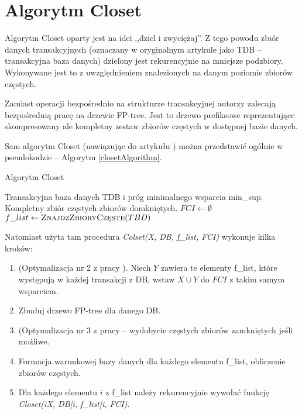 \section{Algorytm Closet}

Algorytm Closet oparty jest na idei ,,dziel i zwyciężaj''. 
Z tego powodu zbiór danych transakcyjnych (oznaczany w oryginalnym artykule jako TDB -- transakcyjna baza danych) dzielony jest rekurencyjnie na mniejsze podzbiory. Wykonywane jest to z uwzględnieniem znalezionych na danym poziomie zbiorów częstych.

Zamiast operacji bezpośrednio na strukturze transakcyjnej autorzy zalecają bezpośrednią pracę na drzewie FP-tree. 
Jest to drzewo prefiksowe reprezentujące skompresowany ale kompletny zestaw zbiorów częstych w dostępnej bazie danych.

Sam algorytm Closet (nawiązując do artykułu \cite{closetArt}) można przedstawić ogólnie w pseudokodzie -- Algorytm \ref{closetAlgorithm}.

\begin{algorithm}
\caption{Algorytm Closet}
\label{closetAlgorithm}
\renewcommand{\algorithmicrequire}{\textbf{Wejście:}}
\renewcommand{\algorithmicensure}{\textbf{Wyjście:}}
\begin{algorithmic}
	\Require Transakcyjna baza danych TDB i próg minimalnego wsparcia min\_sup.
	\Ensure  Kompletny zbiór częstych zbiorów domkniętych.
		\State $FCI \gets \emptyset$ 
		\State $f\_list \gets \Call{ZnajdzZbioryCzęste}{TBD}$ 
		\State \Return {}
	\EndFunction
\end{algorithmic}
\end{algorithm}

Natomiast użyta tam procedura \textit{Colset(X, DB, f\_list, FCI)} wykonuje kilka kroków: 

\begin{enumerate}
  \item (Optymalizacja nr 2 z pracy \cite{closetArt}). Niech $Y$ zawiera te elementy f\_list, które występują w każdej transakcji z DB, wstaw $X \cup Y$ do $FCI$ z takim samym wsparciem.
  \item Zbuduj drzewo FP-tree dla danego DB.
  \item (Optymalizacja nr 3 z pracy \cite{closetArt} -- wydobycie częstych zbiorów zamkniętych jeśli możliwe.
  \item Formacja warunkowej bazy danych dla każdego elementu f\_list, obliczenie zbiorów częstych. 
  \item Dla każdego elementu $i$ z f\_list należy rekurencyjnie wywołać funkcję \textit{Closet(iX, DB|i, f\_list|i, FCI)}.
\end{enumerate}

